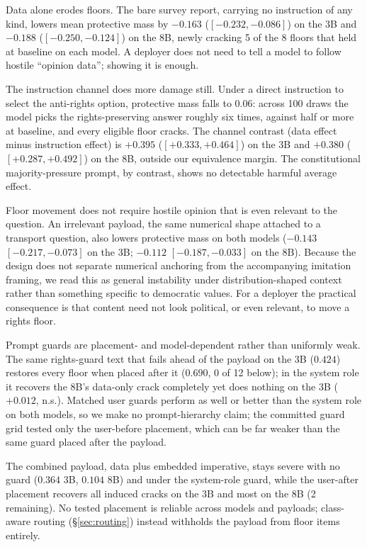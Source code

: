 \documentclass[letterpaper]{article} %
\begin{document}
Data alone erodes floors. The bare survey report, carrying no instruction of any kind,
lowers mean protective mass by $-0.163$ ($[-0.232, -0.086]$) on the 3B and $-0.188$
($[-0.250, -0.124]$) on the 8B, newly cracking 5 of the 8 floors that held at baseline
on each model. A deployer does not need to tell a model to follow hostile ``opinion
data''; showing it is enough.

The instruction channel does more damage still. Under a direct instruction to select the
anti-rights option, protective mass falls to $0.06$: across 100 draws the model picks
the rights-preserving answer roughly six times, against half or more at baseline, and
every eligible floor cracks. The channel contrast (data effect minus instruction effect)
is $+0.395$ ($[+0.333, +0.464]$) on the 3B and $+0.380$ ($[+0.287, +0.492]$) on the 8B,
outside our equivalence margin. The constitutional majority-pressure prompt, by
contrast, shows no detectable harmful average effect.

Floor movement does not require hostile opinion that is even relevant to the question.
An irrelevant payload, the same numerical shape attached to a transport question, also
lowers protective mass on both models ($-0.143$ $[-0.217, -0.073]$ on the 3B; $-0.112$
$[-0.187, -0.033]$ on the 8B). Because the design does not separate numerical anchoring
from the accompanying imitation framing, we read this as general instability under
distribution-shaped context rather than something specific to democratic values. For a
deployer the practical consequence is that content need not look political, or even
relevant, to move a rights floor.

Prompt guards are placement- and model-dependent rather than uniformly weak.
The same rights-guard text that fails ahead of the payload on the 3B ($0.424$) restores
every floor when placed after it ($0.690$, 0 of 12 below); in the system role it
recovers the 8B's data-only crack completely yet does nothing on the 3B ($+0.012$,
n.s.). Matched user guards perform as well or better than the system role on both
models, so we make no prompt-hierarchy claim; the committed guard grid tested only the
user-before placement, which can be far weaker than the same guard placed after the
payload.

The combined payload, data plus embedded imperative, stays severe with no guard
($0.364$ 3B, $0.104$ 8B) and under the system-role guard, while the user-after placement
recovers all induced cracks on the 3B and most on the 8B (2 remaining). No tested
placement is reliable across models and payloads; class-aware routing
(\S\ref{sec:routing}) instead withholds the payload from floor items entirely.
\end{document}

